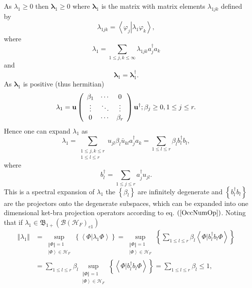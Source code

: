 \documentclass[aps,preprint]{revtex4}%
\begin{document}
As $\lambda_{1}\geq0$ then $\mathbf{\lambda}_{1}\geq0$ where $\mathbf{\lambda
}_{1}$ is the matrix with matrix elements $\lambda_{1jk}$ defined by
\begin{equation}
\lambda_{1jk}=\left\langle \left.  \varphi_{j}\right\vert \lambda_{1}%
\varphi_{k}\right\rangle ,
\end{equation}
where
\begin{equation}
\lambda_{1}=\sum_{1\leq j,k\leq\infty}\lambda_{1jk}a_{j}^{\dagger}a_{k}%
\end{equation}
and
\begin{equation}
\mathbf{\lambda}_{1}=\mathbf{\lambda}_{1}^{\dagger}.
\end{equation}
As $\mathbf{\lambda}_{1}$ is positive (thus hermitian)
\begin{equation}
\mathbf{\lambda}_{1}=\mathbf{u}\left(
\begin{array}
[c]{ccc}%
\beta_{1} & \cdots & 0\\
\vdots & \ddots & \vdots\\
0 & \cdots & \beta_{r}%
\end{array}
\right)  \mathbf{u}^{\dagger};\beta_{j}\geq0,1\leq j\leq r.
\end{equation}
Hence one can expand $\lambda_{1}$ as
\begin{equation}
\lambda_{1}=\sum_{\substack{1\leq j,k\leq r\\1\leq l\leq r}}u_{jl}\beta
_{l}\bar{u}_{kl}a_{j}^{\dagger}a_{k}=\sum_{1\leq l\leq r}\beta_{l}%
b_{l}^{\dagger}b_{l},
\end{equation}
where%
\begin{equation}
b_{l}^{\dagger}=\sum_{1\leq j\leq r}a_{j}^{\dagger}u_{jl}.
\end{equation}
This is a spectral expansion of $\lambda_{1}$ the $\left\{  \beta_{l}\right\}
$ are infinitely degenerate and $\left\{  b_{l}^{\dagger}b_{l}\right\}  $ are
the projectors onto the degenerate subspaces, which can be expanded into one
dimensional ket-bra projection operators according to eq. $\left(
\ref{OccNumOp}\right)  $. Noting that if $\lambda_{1}\in\mathfrak{B}%
_{1+}\left(  \mathcal{B}\left(  \mathcal{H}_{F}\right)  _{e1}\right)  $
\begin{align}
\left\Vert \lambda_{1}\right\Vert  &  =\sup_{\substack{\left\Vert
\Phi\right\Vert =1\\\left\vert \Phi\right\rangle \in\mathcal{H}_{F}}}\left\{
\left\langle \left.  \Phi\right\vert \lambda_{1}\Phi\right\rangle \right\}
=\sup_{\substack{\left\Vert \Phi\right\Vert =1\\\left\vert \Phi\right\rangle
\in\mathcal{H}_{F}}}\left\{  \sum_{1\leq l\leq r}\beta_{l}\left\langle \left.
\Phi\right\vert b_{l}^{\dagger}b_{l}\Phi\right\rangle \right\} \\
&  =\sum_{1\leq l\leq r}\beta_{l}\sup_{\substack{\left\Vert \Phi\right\Vert
=1\\\left\vert \Phi\right\rangle \in\mathcal{H}_{F}}}\left\{  \left\langle
\left.  \Phi\right\vert b_{l}^{\dagger}b_{l}\Phi\right\rangle \right\}
=\sum_{1\leq l\leq r}\beta_{l}\leq1,
\end{align}
\end{document}
